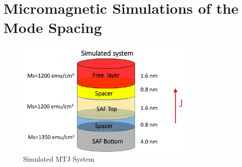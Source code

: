\begin{figure}[!ht]
\centering
{}
\caption{}
\end{figure}


\clearpage


\section{Micromagnetic Simulations of the Mode Spacing}

\begin{figure}[!ht]
  \centering
  \includegraphics[width=0.8\textwidth]{fig/2018/simulated}
   \caption{Simulated MTJ System}
  \label{fig:simulated}
\end{figure}




